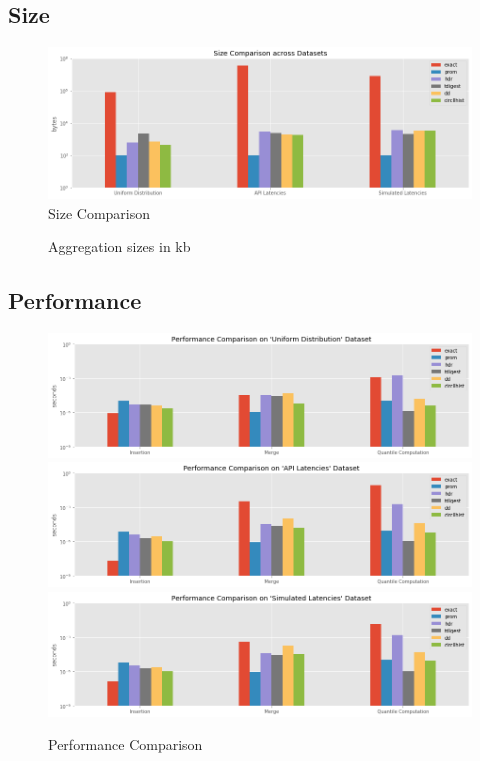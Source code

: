 \documentclass{article}
\theoremstyle{plain}
\theoremstyle{remark}
\begin{document}
\clearpage
\subsection{Size}

\begin{figure}[t!]
  \includegraphics[width=\textwidth]{evaluation/images/all_size.png}
  \caption{Size Comparison}
\end{figure}

\begin{figure}
  \centering
  
  \caption{Aggregation sizes in kb}
\end{figure}

\clearpage
\subsection{Performance}

\begin{figure}
  \includegraphics[width=\textwidth]{evaluation/images/Uniform_Distribution_perf.png}
  \includegraphics[width=\textwidth]{evaluation/images/API_Latencies_perf.png}
  \includegraphics[width=\textwidth]{evaluation/images/Simulated_Latencies_perf.png}
  \caption{Performance Comparison}
\end{figure}
\end{document}
